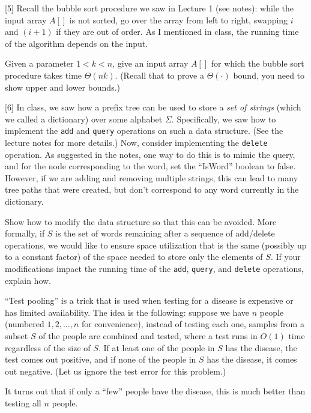 \documentclass[addpoints, 11pt]{exam}
\begin{document}
\begin{questions}
[5]
Recall the bubble sort procedure we saw in Lecture 1 (see notes): while the input array $A[]$ is not sorted, go over the array from left to right, swapping $i$ and $(i+1)$ if they are out of order. As I mentioned in class, the running time of the algorithm depends on the input. 

Given a parameter $1< k < n$, give an input array $A[]$ for which the bubble sort procedure takes time $\Theta(nk)$.  (Recall that to prove a $\Theta(\cdot)$ bound, you need to show upper and lower bounds.)

[6]
In class, we saw how a prefix tree can be used to store a {\em set of strings} (which we called a dictionary) over some alphabet $\Sigma$. Specifically, we saw how to implement the \texttt{add} and \texttt{query} operations on such a data structure. (See the lecture notes for more details.) Now, consider implementing the \texttt{delete} operation. As suggested in the notes, one way to do this is to mimic the 
query, and for the node corresponding to the word, set the ``IsWord'' boolean to false. However, if we are adding and removing multiple strings, this can lead to many tree paths that were created, but don't correspond to any word currently in the dictionary.

Show how to modify the data structure so that this can be avoided. More formally, if $S$ is the set of words remaining after a sequence of add/delete operations, we would like to ensure space utilization that is the same (possibly up to a constant factor) of the space needed to store only the elements of $S$. If your modifications impact the running time of the \texttt{add}, \texttt{query}, and \texttt{delete} operations, explain how.

``Test pooling'' is a trick that is used when testing for a disease is expensive or has limited availability. The idea is the following: suppose we have $n$ people (numbered $1, 2, \dots, n$ for convenience), instead of testing each one, samples from a subset $S$ of the people are combined and tested, where a test runs in $O(1)$ time regardless of the size of $S$. If at least one of the people in $S$ has the disease, the test comes out positive, and if none of the people in $S$ has the disease, it comes out negative. (Let us ignore the test error for this problem.)

It turns out that if only a ``few'' people have the disease, this is much better than testing all $n$ people.
\begin{parts}

\end{parts}
\end{questions}
\end{document}
